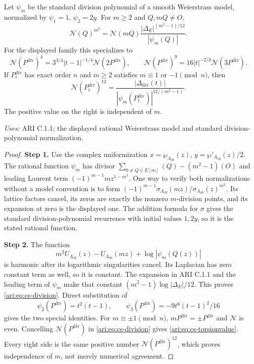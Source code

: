 \begin{proposition}\label{ari:C.4.2}
Let $\psi_m$ be the standard division polynomial of a smooth
Weierstrass model, normalized by $\psi_1=1$, $\psi_2=2y$.
For $m\ge2$ and $Q,mQ\ne O$,
\begin{equation}\label{ari:eq:cs-division}
 \mathcal N(Q)^{m^2}
       =\mathcal N(mQ)\frac{|\Delta_E|^{(m^2-1)/12}}{|\psi_m(Q)|}.
\end{equation}
For the displayed family this specializes to
\[
 \mathcal N(P^{\mathrm{div}})^4=3^{3/4}|t-1|^{-1/4}\mathcal N(2P^{\mathrm{div}}),\qquad
 \mathcal N(P^{\mathrm{div}})^9=16|t|^{-2/3}\mathcal N(3P^{\mathrm{div}}).
\]
If $P^{\mathrm{div}}_t$ has exact order $n$ and $m\ge2$ satisfies
$m\equiv1$ or $-1\pmod n$, then
\begin{equation}\label{ari:eq:cs-torsionvalue}
 \mathcal N(P^{\mathrm{div}}_t)^{12}
       =\frac{|\Delta_{\mathrm{div}}(t)|}{|\psi_m(P^{\mathrm{div}}_t)|^{12/(m^2-1)}}.
\end{equation}
The positive value on the right is independent of $m$.
\end{proposition}
\noindent\textit{Uses:} ARI C.1.1; the displayed rational Weierstrass model and standard division-polynomial normalization.\par
\begin{proof}
\noindent\textbf{Step 1.} Use the complex uniformization $x=\wp_{\Lambda_{\mathrm{ell}}}(z)$,
$y=\wp'_{\Lambda_{\mathrm{ell}}}(z)/2$. The rational function $\psi_m$ has divisor
$\sum_{0\ne Q\in E[m]}(Q)-(m^2-1)(O)$ and leading Laurent term
$(-1)^{m-1}m z^{1-m^2}$. One way to verify both normalizations without
a model convention is to form
$(-1)^{m-1}\sigma_{\Lambda_{\mathrm{ell}}}(mz)/\sigma_{\Lambda_{\mathrm{ell}}}(z)^{m^2}$.
Its lattice factors cancel, its zeros are exactly the nonzero
$m$-division points, and its expansion at zero is the displayed
one. The addition formula for $\sigma$ gives the standard
division-polynomial recurrence with initial values $1,2y$, so it is
the stated rational function.


\noindent\textbf{Step 2.} The function
\[
 m^2U_{\Lambda_{\mathrm{ell}}}(z)-U_{\Lambda_{\mathrm{ell}}}(mz)
                    +\log|\psi_m(Q(z))|
\]
is harmonic after its logarithmic singularities cancel. Its
Laplacian has zero constant term as well, so it is constant.
The expansion in ARI C.1.1 and the leading term of $\psi_m$ make that
constant $(m^2-1)\log|\Delta_E|/12$. This proves
\eqref{ari:eq:cs-division}. Direct substitution of
\[
 \psi_2(P^{\mathrm{div}})=t^2(t-1),\qquad
 \psi_3(P^{\mathrm{div}})=-9t^6(t-1)^2/16
\]
gives the two special identities. For $m\equiv\pm1\pmod n$,
$mP^{\mathrm{div}}=\pm P^{\mathrm{div}}$ and $\mathcal N$ is even. Cancelling $\mathcal N(P^{\mathrm{div}})$ in
\eqref{ari:eq:cs-division} gives \eqref{ari:eq:cs-torsionvalue}.
Every right side is the same positive number $\mathcal N(P^{\mathrm{div}})^{12}$, which
proves independence of $m$, not merely numerical agreement.
\end{proof}

